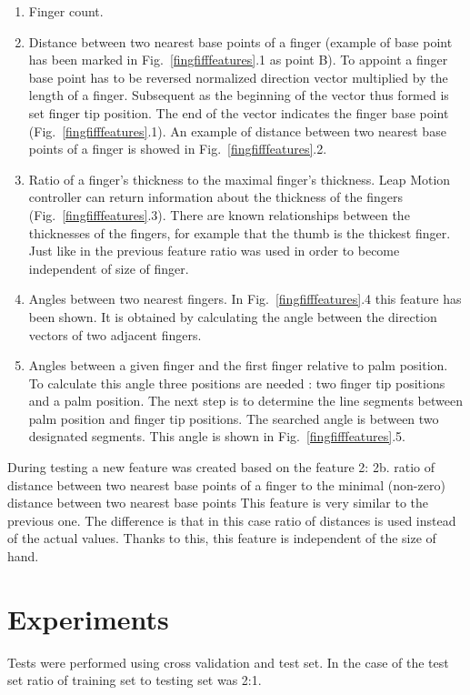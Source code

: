 \begin{enumerate}
\item Finger count. 
\item Distance between two nearest base points of a finger (example of base point has been marked in Fig.~\ref{fingfifffeatures}.1 as point B).
To appoint a finger base point has to be reversed normalized direction vector multiplied by the length of a finger. Subsequent as the beginning of the vector thus formed is set finger tip position. The end of the vector indicates the finger base point (Fig.~\ref{fingfifffeatures}.1). An example of distance between two nearest base points of a finger is showed in Fig.~\ref{fingfifffeatures}.2.
\item Ratio of a finger's thickness to the maximal finger's thickness. 
Leap Motion controller can return information about the thickness of the fingers (Fig.~\ref{fingfifffeatures}.3). There are known relationships between the thicknesses of the fingers, for example that the thumb is the thickest finger. Just like in the previous feature ratio was used in order to become independent of size of finger.
\item Angles between two nearest fingers.
In Fig.~\ref{fingfifffeatures}.4  this feature has been shown. It is obtained by calculating the angle between the direction vectors of two adjacent fingers.
\item Angles between a given finger and the first finger relative to palm position. 
To calculate this angle three positions are needed : two finger tip positions and a palm position. The next step is to determine the line segments between palm position and finger tip positions. The searched angle is between two designated segments. This angle is shown in Fig.~\ref{fingfifffeatures}.5.
\end{enumerate}

During testing a new feature was created based on the feature 2:\newline
2b. ratio of distance between two nearest base points of a finger to the minimal (non-zero) distance between two nearest base points
This feature is very similar to the previous one. The difference is that in this case ratio of distances is used instead of the actual values. Thanks to this, this feature is independent of the size of hand.

\section{Experiments}
Tests were performed using cross validation and test set. In the case of the test set ratio of training set to testing set was 2:1.


